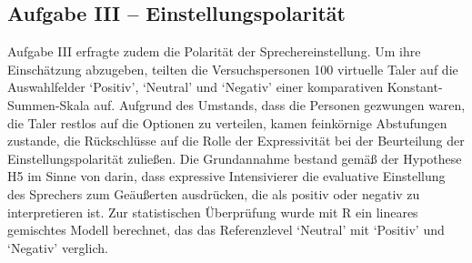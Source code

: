 \subsection{Aufgabe III -- Einstellungspolarität}
Aufgabe III erfragte zudem die Polarität der Sprechereinstellung. Um ihre Einschätzung abzugeben, teilten die Versuchspersonen 100 virtuelle Taler auf die Auswahlfelder `Positiv', `Neutral' und `Negativ' einer komparativen Konstant-Summen-Skala auf. Aufgrund des Umstands, dass die Personen gezwungen waren, die Taler restlos auf die Optionen zu verteilen, kamen feinkörnige Abstufungen zustande, die Rückschlüsse auf die Rolle der Expressivität bei der Beurteilung der Einstellungspolarität zuließen. Die Grundannahme bestand gemäß der Hypothese H5 im Sinne von {\citet[135]{Gutzmann.2019a}} darin, dass expressive Intensivierer die evaluative Einstellung des Sprechers zum Geäußerten ausdrücken, die als positiv oder negativ zu interpretieren ist. Zur statistischen Überprüfung wurde mit R ein lineares gemischtes Modell berechnet, das das Referenzlevel `Neutral' mit `Positiv' und `Negativ' verglich.


